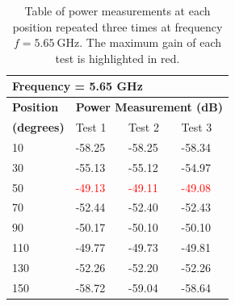 \begin{table}[H]
    \centering
    \begin{tabular}{l|l|l|l}
        \multicolumn{4}{l}{\textbf{Frequency = 5.65 GHz}}         \\
        \hline
        \textbf{Position} & \multicolumn{3}{l}{\textbf{Power Measurement (dB)}} \\
        \textbf{(degrees)}  & Test 1    & Test 2  & Test 3  \\
        \hline
        \hline
        10      & -58.25    & -58.25    & -58.34 \\
        30      & -55.13    & -55.12    & -54.97 \\
        50      & \textcolor{red}{-49.13}    & \textcolor{red}{-49.11}    & \textcolor{red}{-49.08} \\
        70      & -52.44    & -52.40    & -52.43 \\
        90      & -50.17    & -50.10    & -50.10 \\
        110     & -49.77    & -49.73    & -49.81 \\
        130     & -52.26    & -52.20    & -52.26 \\
        150     & -58.72    & -59.04    & -58.64
        \end{tabular}
    \caption{Table of power measurements at each position repeated three times at frequency $f=\SI{5.65}{\giga\hertz}$. The maximum gain of each test is highlighted in red.}
    \label{tab:a2_3b}
\end{table}